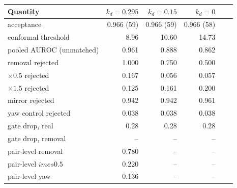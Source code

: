 \begin{tabular}{lrrrrr}
\toprule
Quantity & $k_d=0.295$ & $k_d=0.15$ & $k_d=0$ \\
\midrule
acceptance & 0.966 (59) & 0.966 (59) & 0.966 (58) \\
conformal threshold & 8.96 & 10.60 & 14.73 \\
pooled AUROC (unmatched) & 0.961 & 0.888 & 0.862 \\
\midrule
removal rejected & 1.000 & 0.750 & 0.500 \\
$\times 0.5$ rejected & 0.167 & 0.056 & 0.057 \\
$\times 1.5$ rejected & 0.125 & 0.161 & 0.200 \\
mirror rejected & 0.942 & 0.942 & 0.961 \\
yaw control rejected & 0.038 & 0.038 & 0.038 \\
\midrule
gate drop, real & 0.28 & 0.28 & 0.28 \\
gate drop, removal & -- & -- & -- \\
\midrule
pair-level removal & 0.780 & -- & -- \\
pair-level $	imes 0.5$ & 0.220 & -- & -- \\
pair-level yaw & 0.136 & -- & -- \\
\bottomrule
\end{tabular}
